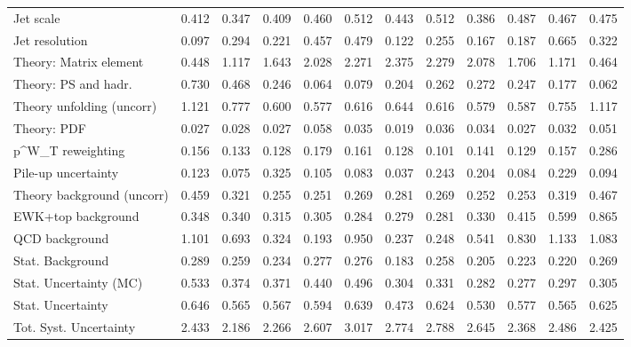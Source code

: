 \begin{tabular}{l|p{0.6cm}p{0.6cm}p{0.6cm}p{0.6cm}p{0.6cm}p{0.6cm}p{0.6cm}p{0.6cm}p{0.6cm}p{0.6cm}p{0.6cm}}
Jet scale                                & 0.412 & 0.347 & 0.409 & 0.460 & 0.512 & 0.443 & 0.512 & 0.386 & 0.487 & 0.467 & 0.475 \\
Jet resolution                           & 0.097 & 0.294 & 0.221 & 0.457 & 0.479 & 0.122 & 0.255 & 0.167 & 0.187 & 0.665 & 0.322 \\
Theory: Matrix element                   & 0.448 & 1.117 & 1.643 & 2.028 & 2.271 & 2.375 & 2.279 & 2.078 & 1.706 & 1.171 & 0.464 \\
Theory: PS and hadr.                     & 0.730 & 0.468 & 0.246 & 0.064 & 0.079 & 0.204 & 0.262 & 0.272 & 0.247 & 0.177 & 0.062 \\
Theory unfolding (uncorr)                & 1.121 & 0.777 & 0.600 & 0.577 & 0.616 & 0.644 & 0.616 & 0.579 & 0.587 & 0.755 & 1.117 \\
Theory: PDF                              & 0.027 & 0.028 & 0.027 & 0.058 & 0.035 & 0.019 & 0.036 & 0.034 & 0.027 & 0.032 & 0.051 \\
p^{W}_{T} reweighting                    & 0.156 & 0.133 & 0.128 & 0.179 & 0.161 & 0.128 & 0.101 & 0.141 & 0.129 & 0.157 & 0.286 \\
Pile-up uncertainty                      & 0.123 & 0.075 & 0.325 & 0.105 & 0.083 & 0.037 & 0.243 & 0.204 & 0.084 & 0.229 & 0.094 \\
Theory background (uncorr)               & 0.459 & 0.321 & 0.255 & 0.251 & 0.269 & 0.281 & 0.269 & 0.252 & 0.253 & 0.319 & 0.467 \\
EWK+top background                       & 0.348 & 0.340 & 0.315 & 0.305 & 0.284 & 0.279 & 0.281 & 0.330 & 0.415 & 0.599 & 0.865 \\
QCD background                           & 1.101 & 0.693 & 0.324 & 0.193 & 0.950 & 0.237 & 0.248 & 0.541 & 0.830 & 1.133 & 1.083 \\
Stat. Background                         & 0.289 & 0.259 & 0.234 & 0.277 & 0.276 & 0.183 & 0.258 & 0.205 & 0.223 & 0.220 & 0.269 \\
Stat. Uncertainty (MC)                   & 0.533 & 0.374 & 0.371 & 0.440 & 0.496 & 0.304 & 0.331 & 0.282 & 0.277 & 0.297 & 0.305 \\
\hline
Stat. Uncertainty                        & 0.646 & 0.565 & 0.567 & 0.594 & 0.639 & 0.473 & 0.624 & 0.530 & 0.577 & 0.565 & 0.625 \\
\hline
Tot. Syst. Uncertainty                   & 2.433 & 2.186 & 2.266 & 2.607 & 3.017 & 2.774 & 2.788 & 2.645 & 2.368 & 2.486 & 2.425 \\
\hline
\end{tabular}
